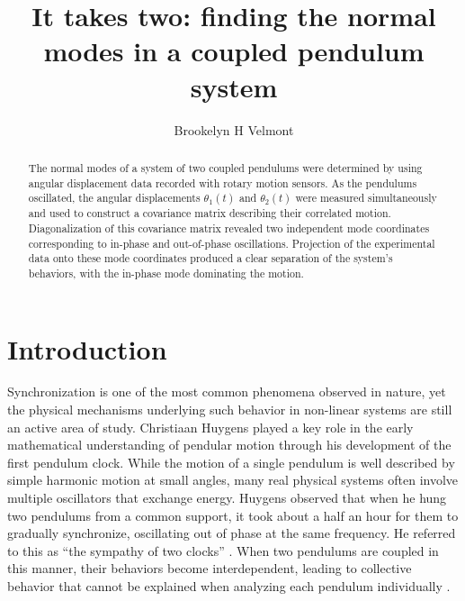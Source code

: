 \documentclass[reprint,amsmath,amssymb,aps,prb,footinbib,floatfix]{revtex4-2}
\begin{document}
 

\vspace*{25pt}


\title{It takes two: finding the normal modes in a coupled pendulum system}
\author{Brookelyn H Velmont}
%
\begin{abstract}
 The normal modes of a system of two coupled pendulums were determined by using angular displacement data recorded with rotary motion sensors. As the pendulums oscillated, the angular displacements $\theta_1(t)$ and $\theta_2(t)$ were measured simultaneously and used to construct a covariance matrix describing their correlated motion. Diagonalization of this covariance matrix revealed two independent mode coordinates corresponding to in-phase and out-of-phase oscillations. Projection of the experimental data onto these mode coordinates produced a clear separation of the system's behaviors, with the in-phase mode dominating the motion.
\end{abstract}

\maketitle

\vspace*{\fill}
\section{Introduction}
Synchronization is one of the most common phenomena observed in nature, yet the physical mechanisms underlying such behavior in non-linear systems are still an active area of study. Christiaan Huygens played a key role in the early mathematical understanding of pendular motion through his development of the first pendulum clock. While the motion of a single pendulum is well described by simple harmonic motion at small angles, many real physical systems often involve multiple oscillators that exchange energy. Huygens observed that when he hung two pendulums from a common support, it took about a half an hour for them to gradually synchronize, oscillating out of phase at the same frequency. He referred to this as “the sympathy of two clocks” \cite{Pena_Ramirez_undated-ie}. When two pendulums are coupled in this manner, their behaviors become interdependent, leading to collective behavior that cannot be explained when analyzing each pendulum individually \cite{pena2016sympathy}.
\end{document}
